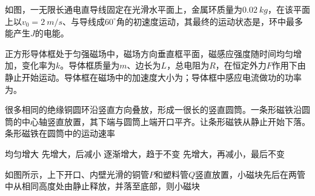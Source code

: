 
\begin{enumerate}
\renewcommand{\labelenumi}{\arabic{enumi}.}
\begin{minipage}[h!]{0.7\linewidth}
\vspace{0.3em}
\item
{}
如图，一无限长通电直导线固定在光滑水平面上，金属环质量为$ 0.02 \ kg $，在该平面上以$ v_0=2 \ m/s $、与导线成$ 60 ^{ \circ } $角的初速度运动，其最终的运动状态是，环中最多能产生$ J $的电能。
\vspace{0.3em}
\end{minipage}
\hfill
\begin{minipage}[h!]{0.3\linewidth}
\flushright
\vspace{0.3em}

\vspace{0.3em}
\end{minipage}



\item 
{}
正方形导体框处于匀强磁场中，磁场方向垂直框平面，磁感应强度随时间均匀增加，变化率为$ k $。导体框质量为$ m $、边长为$ L $，总电阻为$ R $，在恒定外力$ F $作用下由静止开始运动。导体框在磁场中的加速度大小为；导体框中感应电流做功的功率为。
\begin{figure}[h!]
\centering

\end{figure}



\item 
{}
很多相同的绝缘铜圆环沿竖直方向叠放，形成一很长的竖直圆筒。一条形磁铁沿圆筒的中心轴竖直放置，其下端与圆筒上端开口平齐。让条形磁铁从静止开始下落。条形磁铁在圆筒中的运动速率  


\fourchoices
{均匀增大 }
{先增大，后减小}
{逐渐增大，趋于不变 }
{先增大，再减小，最后不变}



\item 
{}
如图所示，上下开口、内壁光滑的铜管$ P $和塑料管$ Q $竖直放置，小磁块先后在两管中从相同高度处由静止释放，并落至底部，则小磁块  



\end{enumerate}
